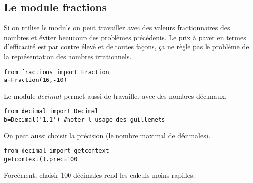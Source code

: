 \subsection{Le module fractions}
Si on utilise le module  on peut travailler avec des valeurs fractionnaires des nombres et éviter beaucoup des problèmes précédents. Le prix à payer en termes d'efficacité est par contre élevé et de toutes façons, ça ne règle pas le problème de la représentation des nombres irrationnels.
\begin{lstlisting}
from fractions import Fraction
a=Fraction(16,-10) 
\end{lstlisting}
Le module $decimal$ permet aussi de travailler avec des nombres décimaux.
\begin{lstlisting}
from decimal import Decimal
b=Decimal('1.1') #noter l usage des guillemets
\end{lstlisting}
On peut aussi choisir la précision (le nombre maximal de décimales).
\begin{lstlisting}
from decimal import getcontext
getcontext().prec=100
\end{lstlisting}
Forcément, choisir $100$ décimales rend les calculs moins rapides.
